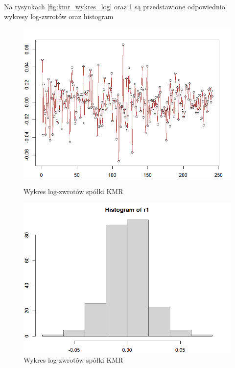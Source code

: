 \documentclass[a4paper,11pt]{article}
\begin{document}
Na rysynkach \ref{fig:kmr_wykres_log} oraz \ref{fig:kmr_hist_log} są przedstawione odpowiednio wykresy log-zwrotów oraz histogram
\begin{figure}[!htb]
    \centering

    \begin{minipage}{.45\textwidth}
        \centering
        \includegraphics[width=\linewidth]{images/kmr_wykres_log.png}
        \caption{Wykres log-zwrotów spółki KMR}
        \label{fig:kmr_wykres_log}
    \end{minipage}\hspace{0.1\textwidth}%
    \begin{minipage}{.45\textwidth}
        \centering
        \includegraphics[width=\linewidth]{images/kmr_hist_log.png}
        \caption{Wykres log-zwrotów spółki KMR}
        \label{fig:kmr_hist_log}
    \end{minipage}
\end{figure}
\end{document}
